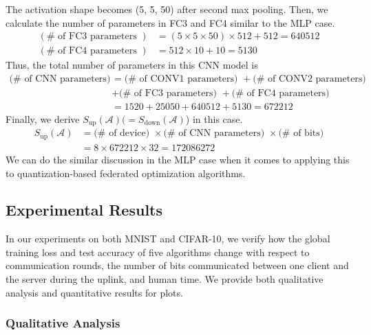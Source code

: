 \documentclass[11pt]{article}
\begin{document}
The activation shape becomes (5, 5, 50) after second max pooling. Then, we calculate the number of parameters in FC3 and FC4 similar to the MLP case.
\begin{align*}
    (\# \textrm{ of FC3 parameters }) &= (5 \times 5 \times 50) \times 512 + 512 = 640512 \\
    (\# \textrm{ of FC4 parameters }) &= 512 \times 10 + 10 = 5130
\end{align*}
Thus, the total number of parameters in this CNN model is
\begin{align*}
    (\# \textrm{ of CNN parameters) } &= (\# \textrm{ of CONV1 parameters) } + (\# \textrm{ of CONV2 parameters) } \\
    &+ (\# \textrm{ of FC3 parameters) } + (\# \textrm{ of FC4 parameters) } \\
    &= 1520 + 25050 + 640512 + 5130 = 672212
\end{align*}
Finally, we derive $S_\textrm{up}(\mathcal{A}) (= S_\textrm{down}(\mathcal{A})$) in this case.
\begin{align*}
    S_\textrm{up}(\mathcal{A}) &= (\# \textrm{ of device) } \times (\# \textrm{ of CNN parameters) } \times (\# \textrm{ of bits)} \\
    &= 8 \times 672212 \times 32 = 172086272
\end{align*}
We can do the similar discussion in the MLP case when it comes to applying this to quantization-based federated optimization algorithms.

\subsection{Experimental Results}
\label{experimental_results}

In our experiments on both MNIST and CIFAR-10, we verify how the global training loss and test accuracy of five algorithms change with respect to communication rounds, the number of bits communicated between one client and the server during the uplink, and human time. We provide both qualitative analysis and quantitative results for plots.

\subsubsection{Qualitative Analysis}
\label{qualitative_analysis}
\end{document}
